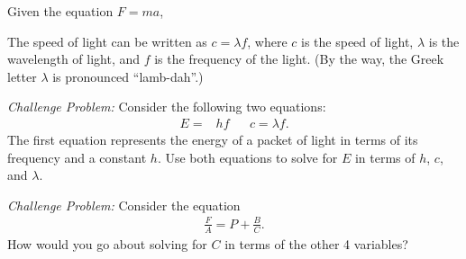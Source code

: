 \begin{questions}
\question Given the equation $F=ma$,
\question
{}

\question The speed of light can be written as $c=\lambda f$, where $c$ is the speed of light, $\lambda$ is the wavelength of light, and $f$ is the frequency of the light. (By the way, the Greek letter $\lambda$ is pronounced ``lamb-dah''.)

\question \emph{Challenge Problem:} Consider the following two equations:
\begin{align*}
E =& hf & & c = \lambda f. 
\end{align*}
The first equation represents the energy of a packet of light in terms of its frequency and a constant $h$. Use both equations to solve for $E$ in terms of $h$, $c$, and $\lambda$. 
\qsppp

\question \emph{Challenge Problem:} Consider the equation
\begin{align*}
\frac{F}{A} = P + \frac{B}{C}.
\end{align*}
How would you go about solving for $C$ in terms of the other 4 variables?
\qsppp
\end{questions}

